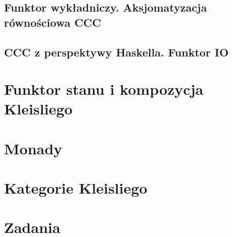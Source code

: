 \documentclass[10pt,a4paper,twoside,openany,parskip=half]{scrbook}
\theoremstyle{definition}
\theoremstyle{plain}
\begin{document}
\section{Funktor wykładniczy. Aksjomatyzacja równościowa CCC}\label{sec:funktor-wykl}

\section{CCC z perspektywy Haskella. Funktor IO}\label{sec:ccc-haskell}


\chapter{Funktor stanu i kompozycja Kleisliego}\label{ch:stan}


\chapter{Monady}\label{ch:monady}


\chapter{Kategorie Kleisliego}\label{ch:kleisli}


\renewcommand{\thechapter}{Z}
\chapter{Zadania}

\end{document}
